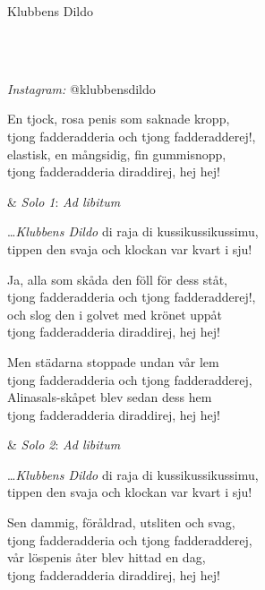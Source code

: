 \begin{song}{Klubbens Dildo}

	\\
	\\
	\begin{footnotesize}
	\textit{Instagram:} @klubbensdildo
	\end{footnotesize}

    
    \showversenumber
    En tjock, rosa penis som saknade kropp,\\
	tjong fadderadderia och tjong fadderadderej!,\\
	elastisk, en mångsidig, fin gummisnopp,\\
	tjong fadderadderia diraddirej, hej hej!
	
	\vspace{0.3cm}
	\begin{alternatinglyrics}[2]
		&	\emph{Solo 1}: \emph{Ad libitum}
	\end{alternatinglyrics}

	\dots \emph{Klubbens Dildo} di raja di kussikussikussimu,\\
	tippen den svaja och klockan var kvart i sju!

	\showversenumber
	Ja, alla som skåda den föll för dess ståt,\\
	tjong fadderadderia och tjong fadderadderej!,\\
	och slog den i golvet med krönet uppåt\\
	tjong fadderadderia diraddirej, hej hej!
	
	\showversenumber
	Men städarna stoppade undan vår lem\\
	tjong fadderadderia och tjong fadderadderej,\\
	Alinasals-skåpet blev sedan dess hem\\
	tjong fadderadderia diraddirej, hej hej!

	\vspace{0.3cm}
	\begin{alternatinglyrics}[2]
		&	\emph{Solo 2}: \emph{Ad libitum}
	\end{alternatinglyrics}

	\dots \emph{Klubbens Dildo} di raja di kussikussikussimu,\\
	tippen den svaja och klockan var kvart i sju!
	
	\showversenumber
	Sen dammig, föråldrad, utsliten och svag,\\
	tjong fadderadderia och tjong fadderadderej,\\
	vår löspenis åter blev hittad en dag,\\
	tjong fadderadderia diraddirej, hej hej!


\end{song}
